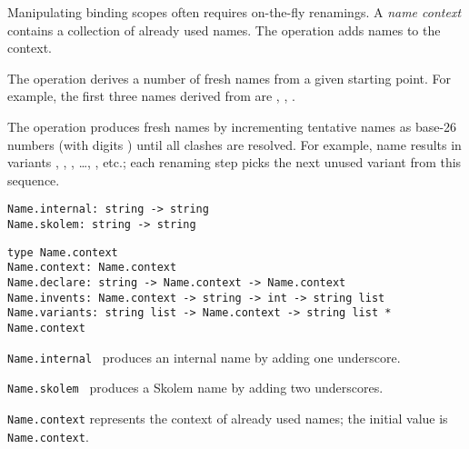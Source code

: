 \begin{isabellebody}
\begin{isamarkuptext}
  \medskip Manipulating binding scopes often requires on-the-fly
  renamings.  A \emph{name context} contains a collection of already
  used names.  The  operation adds names to the
  context.

  The  operation derives a number of fresh names from
  a given starting point.  For example, the first three names derived
  from  are , , .

  The  operation produces fresh names by
  incrementing tentative names as base-26 numbers (with digits ) until all clashes are resolved.  For example, name  results in variants , , , \dots, ,  etc.; each renaming
  step picks the next unused variant from this sequence.%
\end{isamarkuptext}%
\isamarkuptrue%
%
\isadelimmlref
%
\endisadelimmlref
%
\isatagmlref
%
\begin{isamarkuptext}%
\begin{mldecls}
  \verb|Name.internal: string -> string| \\
  \verb|Name.skolem: string -> string| \\
  \end{mldecls}
  \begin{mldecls}
  \verb|type Name.context| \\
  \verb|Name.context: Name.context| \\
  \verb|Name.declare: string -> Name.context -> Name.context| \\
  \verb|Name.invents: Name.context -> string -> int -> string list| \\
  \verb|Name.variants: string list -> Name.context -> string list * Name.context| \\
  \end{mldecls}

  \begin{description}

  \item \verb|Name.internal|~ produces an internal name
  by adding one underscore.

  \item \verb|Name.skolem|~ produces a Skolem name by
  adding two underscores.

  \item \verb|Name.context| represents the context of already used
  names; the initial value is \verb|Name.context|.


\end{description}
\end{isamarkuptext}
\end{isabellebody}

